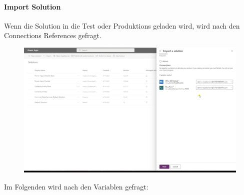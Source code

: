 \paragraph{Import Solution}
Wenn die Solution in die Test oder Produktions \Env geladen wird, wird nach den Connections References gefragt.

\begin{figure}[H]
	\centering
	\includegraphics[scale = 0.3]{attachment/chapter_13/Scc063}
\end{figure}

Im Folgenden wird nach den \Env Variablen gefragt:

